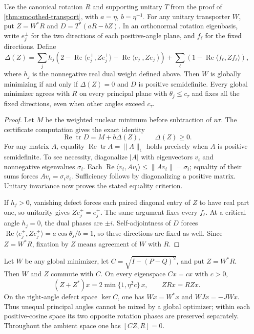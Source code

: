 \begin{proposition}
\label{prop:smoothed-optimizer-certificate}
Use the canonical rotation $R$ and supporting unitary $T$ from the proof
of \cref{thm:smoothed-transport}, with $a=\eta$, $b=\eta^{-1}$.
For any unitary transporter $W$, put $Z=W^*R$ and
$D=T^*(aR-bZ)$. In an orthonormal rotation eigenbasis, write $e_j^\pm$
for the two directions of each positive-angle plane, and $f_\ell$
for the fixed directions. Define
\[
 \Delta(Z)=\sum_j h_j\left(2-\operatorname{Re}
   \langle e_j^+,Ze_j^+\rangle-\operatorname{Re}
   \langle e_j^-,Ze_j^-\rangle\right)
 +\sum_\ell\left(1-\operatorname{Re}\langle f_\ell,Zf_\ell\rangle\right),
\]
where $h_j$ is the nonnegative real dual weight defined above.
Then $W$ is globally minimizing if and only if $\Delta(Z)=0$ and
$D$ is positive semidefinite. Every global minimizer agrees with $R$
on every principal plane with $\theta_j\leq c_\tau$ and fixes all the
fixed directions, even when other angles exceed $c_\tau$.
\end{proposition}

\begin{proof}
Let $M$ be the weighted nuclear minimum before subtraction of $n\tau$.
The certificate computation gives the exact identity
\[
 \operatorname{Re}\operatorname{tr}D=M+b\Delta(Z),\qquad \Delta(Z)\geq0.
\]
For any matrix $A$, equality
$\operatorname{Re}\operatorname{tr}A=\|A\|_1$ holds precisely when $A$
is positive semidefinite. To see necessity, diagonalize $|A|$ with
eigenvectors $v_i$ and nonnegative eigenvalues $\sigma_i$.
Each $\operatorname{Re}\langle v_i,Av_i\rangle\leq\|Av_i\|=\sigma_i$;
equality of their sums forces $Av_i=\sigma_i v_i$. Sufficiency follows
by diagonalizing a positive matrix. Unitary invariance now proves the
stated equality criterion.

If $h_j>0$, vanishing defect forces each paired diagonal entry of $Z$
to have real part one, so unitarity gives $Ze_j^\pm=e_j^\pm$.
The same argument fixes every $f_\ell$. At a critical angle $h_j=0$,
the dual phases are $\pm i$. Self-adjointness of $D$ forces
$\operatorname{Re}\langle e_j^\pm,Ze_j^\pm\rangle
 =a\cos\theta_j/b=1$, so these directions are fixed as well.
Since $Z=W^*R$, fixation by $Z$ means agreement of $W$ with $R$.
\end{proof}

\begin{proposition}
\label{prop:smoothed-optimizer-separation}
Let $W$ be any global minimizer, let $C=\sqrt{I-(P-Q)^2}$, and put
$Z=W^*R$. Then $W$ and $Z$ commute with $C$. On every eigenspace
$Cx=cx$ with $c>0$,
\[
 (Z+Z^*)x=2\min\{1,\eta^2c\}\,x,
 \qquad ZRx=RZx.
\]
On the right-angle defect space $\ker C$, one has
$Wx=W^*x$ and $WJx=-JWx$.
Thus unequal principal angles cannot be mixed by a global optimizer;
within each positive-cosine space its two opposite rotation phases
are preserved separately. Throughout the ambient space one has $[CZ,R]=0$.
\end{proposition}

